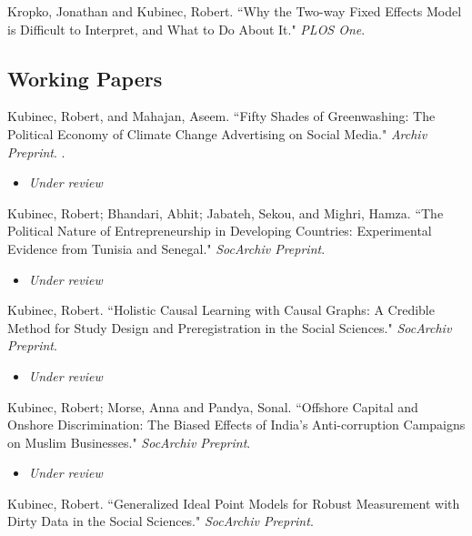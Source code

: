 \documentclass[11pt, a4paper]{article}
\newcommand{\years}[1]{\marginnote{\scriptsize #1}}
\begin{document}
\years{2020}Kropko, Jonathan and Kubinec, Robert. ``Why the Two-way Fixed Effects Model is Difficult to Interpret, and What to Do About It." \textit{PLOS One}. 

\subsection*{Working Papers}
\noindent

\years{2026} Kubinec, Robert, and Mahajan, Aseem. ``Fifty Shades of Greenwashing: The Political Economy of Climate Change Advertising on Social Media." \emph{Archiv Preprint}. .

\begin{itemize}
	\item \emph{Under review}
\end{itemize}

\years{2025} Kubinec, Robert; Bhandari, Abhit; Jabateh, Sekou, and Mighri, Hamza. ``The Political Nature of Entrepreneurship in Developing Countries: Experimental Evidence from Tunisia and Senegal." \emph{SocArchiv Preprint}. \\

\begin{itemize}
	\item \emph{Under review}
\end{itemize}

\years{2024} Kubinec, Robert. ``Holistic Causal Learning with Causal Graphs: A Credible Method for Study Design and Preregistration in the Social Sciences." \emph{SocArchiv Preprint}. \\

\begin{itemize}
	\item \emph{Under review}
\end{itemize}

\years{2024} Kubinec, Robert; Morse, Anna and Pandya, Sonal. ``Offshore Capital and Onshore Discrimination: The Biased Effects of India's Anti-corruption Campaigns on Muslim Businesses." \emph{SocArchiv Preprint}. \\

\begin{itemize}
	\item \emph{Under review}
\end{itemize}

\years{2025} Kubinec, Robert. ``Generalized Ideal Point Models for Robust Measurement with Dirty Data in the Social Sciences." \emph{SocArchiv Preprint}. \\
\end{document}

